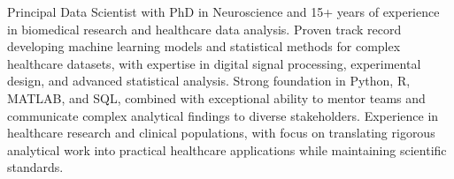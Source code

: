 

\begin{cvparagraph}


 Principal Data Scientist with PhD in Neuroscience and 15+ years of experience in biomedical research and healthcare data analysis. Proven track record developing machine learning models and statistical methods for complex healthcare datasets, with expertise in digital signal processing, experimental design, and advanced statistical analysis. Strong foundation in Python, R, MATLAB, and SQL, combined with exceptional ability to mentor teams and communicate complex analytical findings to diverse stakeholders. Experience in healthcare research and clinical populations, with focus on translating rigorous analytical work into practical healthcare applications while maintaining scientific standards.
\end{cvparagraph}
